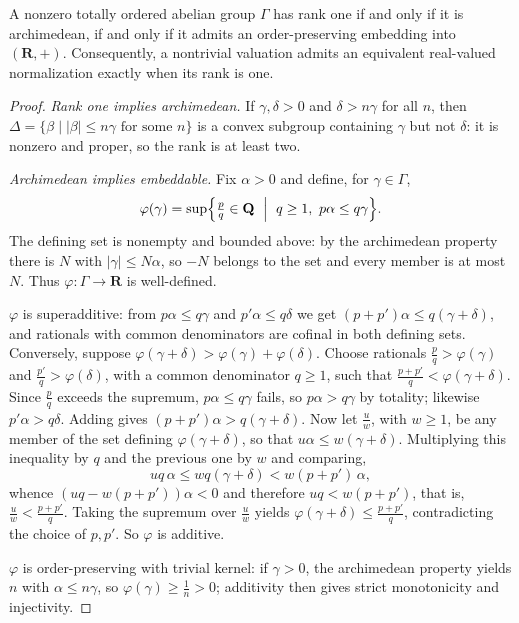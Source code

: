 \begin{proposition}\label{prop:rank-one-real-embedding}
A nonzero totally ordered abelian group $\Gamma$ has rank one if and only
if it is archimedean, if and only if it admits an order-preserving
embedding into $(\mathbf R,+)$. Consequently, a nontrivial valuation
admits an equivalent real-valued normalization exactly when its rank is
one.
\end{proposition}
\begin{proof}
\emph{Rank one implies archimedean.} If $\gamma,\delta>0$ and
$\delta>n\gamma$ for all $n$, then
$\Delta=\{\beta\mid |\beta|\leq n\gamma\text{ for some }n\}$ is a convex
subgroup containing $\gamma$ but not $\delta$: it is nonzero and proper,
so the rank is at least two.

\emph{Archimedean implies embeddable.} Fix $\alpha>0$ and define, for
$\gamma\in\Gamma$,
\[
 \varphi(\gamma)
 =\sup\Bigl\{\tfrac pq\in\mathbf Q\ \Bigm|\ q\geq1,\ p\alpha\leq q\gamma
 \Bigr\}.
\]
The defining set is nonempty and bounded above: by the archimedean
property there is $N$ with $|\gamma|\leq N\alpha$, so $-N$ belongs to the
set and every member is at most $N$. Thus
$\varphi:\Gamma\to\mathbf R$ is well-defined.

$\varphi$ is superadditive: from $p\alpha\leq q\gamma$ and
$p'\alpha\leq q\delta$ we get $(p+p')\alpha\leq q(\gamma+\delta)$, and
rationals with common denominators are cofinal in both defining sets.
Conversely, suppose
$\varphi(\gamma+\delta)>\varphi(\gamma)+\varphi(\delta)$. Choose rationals
$\tfrac pq>\varphi(\gamma)$ and $\tfrac{p'}q>\varphi(\delta)$, with a
common denominator $q\geq1$, such that
$\tfrac{p+p'}q<\varphi(\gamma+\delta)$. Since
$\tfrac pq$ exceeds the supremum, $p\alpha\leq q\gamma$ fails, so
$p\alpha>q\gamma$ by totality; likewise $p'\alpha>q\delta$. Adding gives
$(p+p')\alpha>q(\gamma+\delta)$. Now let $\tfrac uw$, with $w\geq1$, be
any member of the set defining $\varphi(\gamma+\delta)$, so that
$u\alpha\leq w(\gamma+\delta)$. Multiplying this inequality by $q$ and the
previous one by $w$ and comparing,
\[
 uq\,\alpha\leq wq(\gamma+\delta)<w(p+p')\,\alpha ,
\]
whence $(uq-w(p+p'))\alpha<0$ and therefore $uq<w(p+p')$, that is,
$\tfrac uw<\tfrac{p+p'}q$. Taking the supremum over $\tfrac uw$ yields
$\varphi(\gamma+\delta)\leq\tfrac{p+p'}q$, contradicting the choice of
$p,p'$. So $\varphi$ is additive.

$\varphi$ is order-preserving with trivial kernel: if $\gamma>0$, the
archimedean property yields $n$ with $\alpha\leq n\gamma$, so
$\varphi(\gamma)\geq\tfrac1n>0$; additivity then gives strict
monotonicity and injectivity.


\end{proof}
